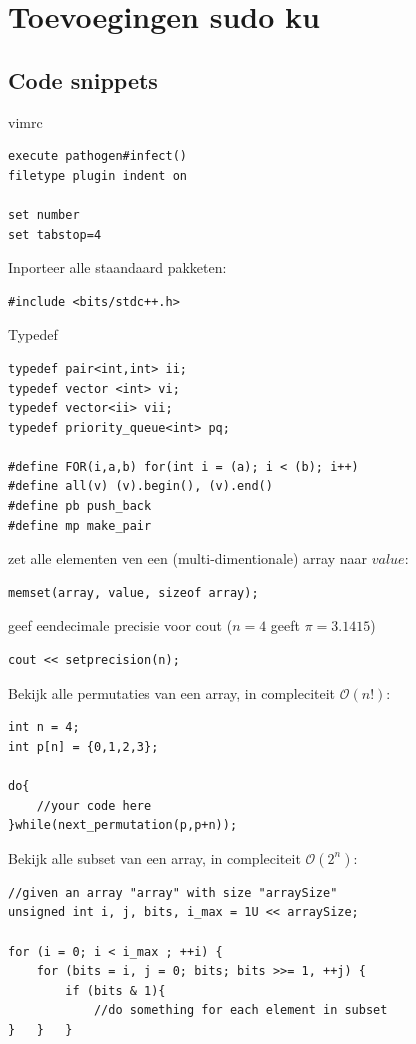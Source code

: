 \documentclass[10pt,a4paper,titlepage]{article}
\renewcommand{\O}{\mathcal{O}}
\begin{document}
\section{Toevoegingen sudo ku}

\subsection{Code snippets}


vimrc
\begin{lstlisting}[morekeywords={set,execute}]
execute pathogen#infect()
filetype plugin indent on

set number
set tabstop=4
\end{lstlisting}


Inporteer alle staandaard pakketen:
\begin{lstlisting}
#include <bits/stdc++.h>
\end{lstlisting}

Typedef
\begin{lstlisting}
typedef pair<int,int> ii;
typedef vector <int> vi;
typedef vector<ii> vii;
typedef priority_queue<int> pq;

#define FOR(i,a,b) for(int i = (a); i < (b); i++)
#define all(v) (v).begin(), (v).end()
#define pb push_back
#define mp make_pair
\end{lstlisting}


zet alle elementen ven een (multi-dimentionale) array naar $value$:
\begin{lstlisting}
memset(array, value, sizeof array);
\end{lstlisting}

geef eendecimale precisie voor cout ($n=4$ geeft $\pi = 3.1415$)
\begin{lstlisting}
cout << setprecision(n);
\end{lstlisting}

Bekijk alle permutaties van een array, in compleciteit $\O(n!)$:
\begin{lstlisting}
int n = 4;
int p[n] = {0,1,2,3};	

do{
	//your code here
}while(next_permutation(p,p+n));
\end{lstlisting}

Bekijk alle subset van een array, in compleciteit $\O(2^n)$:
\begin{lstlisting}
//given an array "array" with size "arraySize"
unsigned int i, j, bits, i_max = 1U << arraySize;
	
for (i = 0; i < i_max ; ++i) {
	for (bits = i, j = 0; bits; bits >>= 1, ++j) {
		if (bits & 1){
			//do something for each element in subset
}	}	}
\end{lstlisting}
\end{document}
